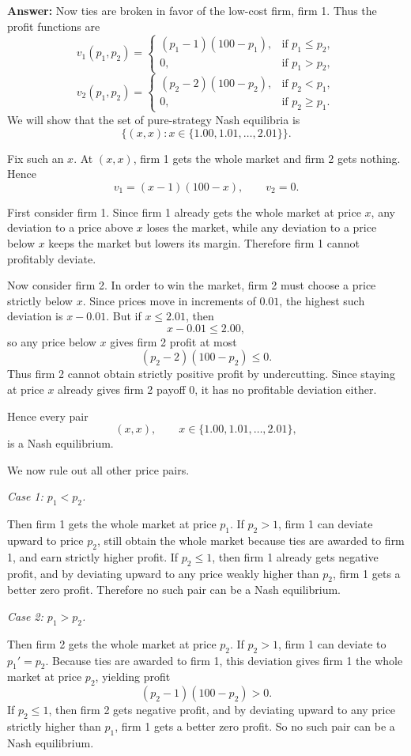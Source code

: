\documentclass[12pt,a4paper]{article}
\begin{document}
\noindent\textbf{Answer:} Now ties are broken in favor of the low-cost firm, firm 1. Thus the profit functions are
\[
    v_1(p_1,p_2)=
    \begin{cases}
        (p_1-1)(100-p_1), & \text{if } p_1\le p_2,\\
        0, & \text{if } p_1>p_2,
    \end{cases}
\]
\[
    v_2(p_1,p_2)=
    \begin{cases}
        (p_2-2)(100-p_2), & \text{if } p_2<p_1,\\
        0, & \text{if } p_2\ge p_1.
    \end{cases}
\]
We will show that the set of pure-strategy Nash equilibria is
\[
\{(x,x): x\in\{1.00,1.01,\dots,2.01\}\}.
\]

Fix such an \(x\). At \((x,x)\), firm 1 gets the whole market and firm 2 gets nothing. Hence
\[
v_1=(x-1)(100-x),\qquad v_2=0.
\]

First consider firm 1. Since firm 1 already gets the whole market at price \(x\), any deviation to a price above \(x\) loses the market, while any deviation to a price below \(x\) keeps the market but lowers its margin. Therefore firm 1 cannot profitably deviate.

Now consider firm 2. In order to win the market, firm 2 must choose a price strictly below \(x\). Since prices move in increments of \(0.01\), the highest such deviation is \(x-0.01\). But if \(x\le 2.01\), then
\[
x-0.01\le 2.00,
\]
so any price below \(x\) gives firm 2 profit at most
\[
(p_2-2)(100-p_2)\le 0.
\]
Thus firm 2 cannot obtain strictly positive profit by undercutting. Since staying at price \(x\) already gives firm 2 payoff \(0\), it has no profitable deviation either.

Hence every pair
\[
(x,x),\qquad x\in\{1.00,1.01,\dots,2.01\},
\]
is a Nash equilibrium.

We now rule out all other price pairs.

\emph{Case 1: \(p_1<p_2\).}

Then firm 1 gets the whole market at price \(p_1\). If \(p_2>1\), firm 1 can deviate upward to price \(p_2\), still obtain the whole market because ties are awarded to firm 1, and earn strictly higher profit. If $p_2\le1$, then firm 1 already gets negative profit, and by deviating upward to any price weakly higher than $p_2$, firm 1 gets a better zero profit. Therefore no such pair can be a Nash equilibrium.

\emph{Case 2: \(p_1>p_2\).}

Then firm 2 gets the whole market at price \(p_2\). If \(p_2>1\), firm 1 can deviate to \(p_1'=p_2\). Because ties are awarded to firm 1, this deviation gives firm 1 the whole market at price \(p_2\), yielding profit
\[
(p_2-1)(100-p_2)>0.
\]
If $p_2\le1$, then firm 2 gets negative profit, and by deviating upward to any price strictly higher than $p_1$, firm 1 gets a better zero profit. So no such pair can be a Nash equilibrium.
\end{document}

